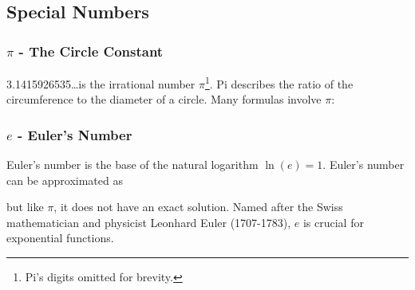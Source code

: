 
\subsection{Special Numbers}\label{Special Numbers}

\subsubsection{$\pi$ - The Circle Constant}\label{Circle Constant}
3.1415926535\dots is the irrational number $\pi$\footnote{Pi's digits omitted for brevity.}. Pi describes the ratio of the circumference to the diameter of a circle. Many formulas involve $\pi$:




\subsubsection{$e$ - Euler's Number}\label{Euler's Number}
Euler's number is the base of the natural logarithm \(\ln(e) = 1\). Euler's number can be approximated as 


but like $\pi$, it does not have an exact solution. Named after the Swiss mathematician and physicist Leonhard Euler (1707-1783), \( e \) is crucial for exponential functions.
